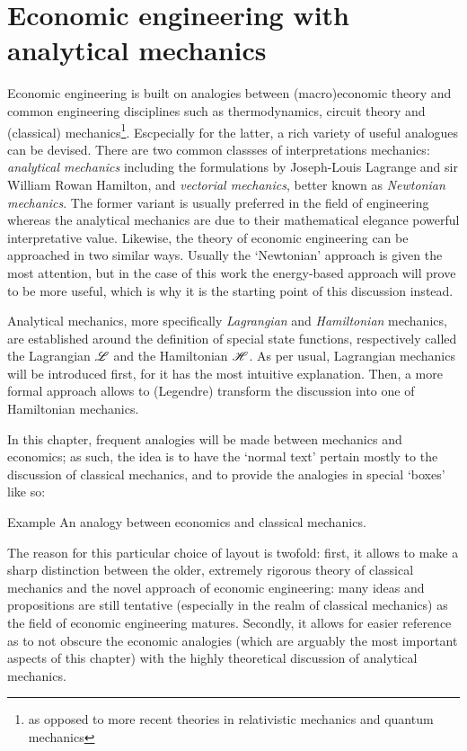 \chapter{Economic engineering with analytical mechanics}
Economic engineering is built on analogies between (macro)economic theory and common engineering disciplines such as thermodynamics, circuit theory and (classical) mechanics\footnote{as opposed to more recent theories in relativistic mechanics and quantum mechanics}. Escpecially for the latter, a rich variety of useful analogues can be devised. There are two common classses of interpretations mechanics: \emph{analytical mechanics} including the formulations by Joseph-Louis Lagrange and sir William Rowan Hamilton, and \emph{vectorial mechanics}, better known as \emph{Newtonian mechanics}. The former variant is usually preferred in the field of engineering whereas the analytical mechanics are due to their mathematical elegance powerful interpretative value. Likewise, the theory of economic engineering can be approached in two similar ways. Usually the `Newtonian' approach is given the most attention, but in the case of this work the energy-based approach will prove to be more useful, which is why it is the starting point of this discussion instead.

Analytical mechanics, more specifically \emph{Lagrangian} and \emph{Hamiltonian} mechanics, are established around the definition of special state functions, respectively called the Lagrangian \(\mathscr{L}\) and the Hamiltonian \(\mathscr{H}\). As per usual, Lagrangian mechanics will be introduced first, for it has the most intuitive explanation. Then, a more formal approach allows to (Legendre) transform the discussion into one of Hamiltonian mechanics. 

In this chapter, frequent analogies will be made between mechanics and economics; as such, the idea is to have the `normal text' pertain mostly to the discussion of classical mechanics, and to provide the analogies in special `boxes' like so:
\begin{econ}{Example}
    An analogy between economics and classical mechanics.
\end{econ}
The reason for this particular choice of layout is twofold: first, it allows to make a sharp distinction between the older, extremely rigorous theory of classical mechanics and the novel approach of economic engineering: many ideas and propositions are still tentative (especially in the realm of classical mechanics) as the field of economic engineering matures. Secondly, it allows for easier reference as to not obscure the economic analogies (which are arguably the most important aspects of this chapter) with the highly theoretical discussion of analytical mechanics.

